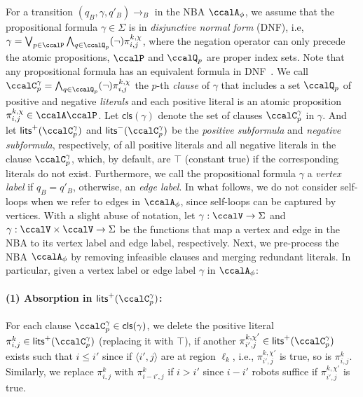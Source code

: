 \documentclass[Afour,sageh,times]{sagej}
\newcommand{\clause}[1]{\mathsf{cls}(#1)}
\newcommand{\cp}[2]{\ccalC_{#1}^{#2}}
\newcommand{\autop}{\ccalA_{\phi}}
\newcommand{\ag}[2]{\langle#1,#2\rangle}
\renewcommand{\ap}[3]{\mathcal{\pi}_{{#1},{#2}}^{#3}}
\begin{document}
For a transition $(q_B, \gamma, q'_B)\to_B$ in the NBA $\autop$, we assume that the propositional formula $\gamma \in \Sigma$ is  in {\it disjunctive normal form} (DNF), i.e,
$ \gamma = \bigvee_{p\in \ccalP} \bigwedge_{q\in \ccalQ_p} (\neg)\ap{i}{j}{k,\chi}$, where the negation operator can only precede the atomic propositions, $\ccalP$ and $\ccalQ_p$ are proper index sets. Note that any propositional formula has an equivalent formula in DNF~\citep{baier2008principles}. We call  $\ccalC_p^{\gamma}=\bigwedge_{q\in \ccalQ_p}(\neg) \ap{i}{j}{k,\chi}$ the $p$-th {\it clause} of $\gamma$ that includes a set $\ccalQ_p$ of positive and negative {\it literals} and each positive literal is an atomic proposition $\ap{i}{j}{k,\chi}\in \ccalA\ccalP$. Let $\mathsf{cls}(\gamma)$ denote the set of clauses $\ccalC_p^{\gamma}$ in $\gamma$. And let $\mathsf{lits}^+(\ccalC_p^{\gamma})$ and $\mathsf{lits}^-(\ccalC_p^{\gamma})$ be the {\it positive subformula} and {\it negative  subformula}, respectively,  of all positive literals and all negative literals in the clause $\ccalC_p^\gamma$, which, by default, are $\top$ (constant true) if the corresponding literals do not exist. Furthermore, we call the propositional formula $\gamma$ a {\it vertex label} if $q_B=q'_B$, otherwise, an {\it edge label}. In what follows, we do not consider self-loops when we refer to edges in $\autop$, since self-loops can be captured by vertices.   With a slight abuse of notation, let {$\gamma: \ccalV \to \Sigma $} and {$\gamma: \ccalV \times \ccalV \to \Sigma$} be the functions that map a vertex and edge in the NBA to its vertex label and edge label, respectively. Next, we  pre-process the NBA $\autop$ by removing infeasible clauses and merging redundant literals.  In particular, given  a vertex label or edge label $\gamma$ in $\autop$:
\paragraph{(1) Absorption in $\mathsf{lits}^+(\cp{p}{\gamma})$:} \label{prune:absorption1} For each clause $\cp{p}{\gamma} \in \clause{\gamma}$, we delete the positive literal $\ap{i}{j}{k} \in \mathsf{lits}^+(\cp{p}{\gamma})$ (replacing it with $\top$), if another $\ap{i'}{j}{k,\chi'} \in \mathsf{lits}^+(\cp{p}{\gamma})$ exists such that $i \leq i'$  since if $\ag{i'}{j}$ are at region $\ell_k$, i.e., $\ap{i'}{j}{k,\chi'}$ is true, so is  $\ap{i}{j}{k}$. Similarly, we replace $\ap{i}{j}{k}$ with $\ap{i-i'}{j}{k}$ if $i > i'$ since $i-i'$ robots suffice if $\ap{i'}{j}{k,\chi'}$ is true.
\end{document}
